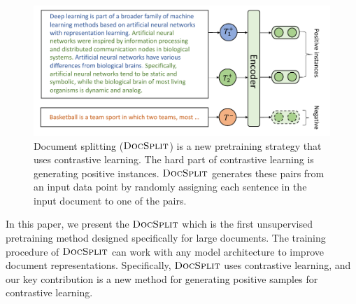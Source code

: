 \documentclass[11pt]{article}
\newcommand{\our}{\mbox{\textsc{DocSplit}}}
\begin{document}
\begin{figure}
\includegraphics[width=\columnwidth]{fig/docsplit.pdf}
\caption{
    Document splitting ($\our$) is a new pretraining strategy that uses contrastive learning.
    The hard part of contrastive learning is generating positive instances.
    $\our$ generates these pairs from an input data point by randomly assigning each sentence in the input document to one of the pairs.
}
\label{overall}
\end{figure}

In this paper, we present the $\our$ which is the first unsupervised pretraining method designed specifically for large documents.
The training procedure of $\our$ can work with any model architecture to improve document representations. 
Specifically, $\our$ uses contrastive learning,
and our key contribution is a new method for generating positive samples for contrastive learning.
\end{document}
